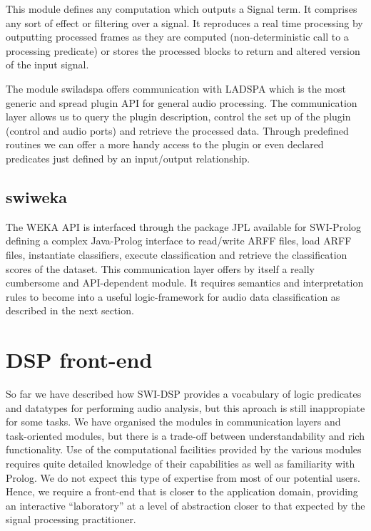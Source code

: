 \documentclass[runningheads]{llncs}
\begin{document}
This module defines any computation which outputs a Signal term. It comprises any sort of effect or filtering over a signal. It reproduces a real time processing by outputting processed frames as they are computed (non-deterministic call to a processing predicate) or stores the processed blocks to return and altered version of the input signal.

The module swiladspa offers communication with LADSPA which is the most generic and spread plugin API for general audio processing. The communication layer allows us to query the plugin description, control the set up of the plugin (control and audio ports) and retrieve the processed data. Through predefined routines we can offer a more handy access to the plugin or even declared predicates just defined by an input/output relationship.

\subsection{swiweka}\label{subsec:swiweka}

The WEKA API is interfaced through the package JPL available for SWI-Prolog defining a complex Java-Prolog interface to read/write ARFF files, load ARFF files, instantiate classifiers, execute classification and retrieve the classification scores of the dataset. This communication layer offers by itself a really cumbersome and API-dependent module. It requires semantics and interpretation rules to become into a useful logic-framework for audio data classification as described in the next section.

\section{DSP front-end}\label{sec:frontend}

So far we have described how SWI-DSP provides a vocabulary of logic predicates and datatypes for performing audio analysis, but this aproach is still inappropiate for some tasks. We have organised the modules in communication layers and task-oriented modules, but there is a trade-off between understandability and rich functionality. 
Use of the computational facilities provided by the various modules requires quite detailed knowledge of their capabilities as well as familiarity with Prolog. We do not expect this type of expertise from most of our potential users. Hence, we require a front-end that is closer to the application domain, providing an interactive ``laboratory'' at a level of abstraction closer to that expected by the signal processing practitioner.
\end{document}
